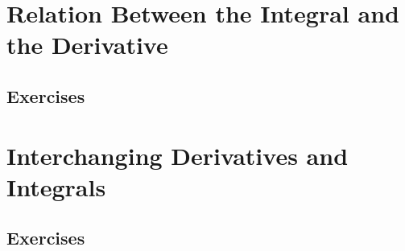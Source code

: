 \section{Relation Between the Integral and\\ the Derivative}\label{sec:10.6}	
\subsection*{Exercises}\label{sec:10.6_Exercises}
\section{Interchanging Derivatives and Integrals}\label{sec:10.7}	
\subsection*{Exercises}\label{sec:10.7_Exercises}
